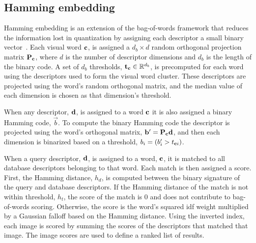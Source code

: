     \subsection{Hamming embedding}
        Hamming embedding is an extension of the bag-of-words framework that reduces the information lost in
        quantization by assigning each descriptor a small binary vector~\cite{jegou_hamming_2008,
        jegou_burstiness_2009, jegou_improving_2010}. Each visual word $\mathbf{c}$, is assigned a $d_b \times d$ random
        orthogonal projection matrix $\mathbf{P}_{\mathbf{c}}$, where $d$ is the number of descriptor dimensions and $d_b$ is
        the length of the binary code. A set of $d_b$ thresholds, $\mathbf{t}_{\mathbf{c}} \in \mathbb{R}^{d_b}$, is precomputed for
        each word using the descriptors used to form the visual word cluster. These descriptors are projected using
        the word's random orthogonal matrix, and the median value of each dimension is chosen as that dimension's
        threshold.

        When any descriptor, $\mathbf{d}$, is assigned to a word $\mathbf{c}$ it is also assigned a binary Hamming code,
        $\vec{b}$. To compute the binary Hamming code the descriptor is projected using the word's orthogonal
        matrix, $\mathbf{b}' = \mathbf{P}_{\mathbf{c}} \mathbf{d}$, and then each dimension is binarized based on a threshold, %
        $b_i = (b'_i > t_{\mathbf{c}{}i})$.

        When a query descriptor, $\mathbf{d}$, is assigned to a word, $\mathbf{c}$, it is matched to all database descriptors
        belonging to that word. Each match is then assigned a score. First, the Hamming distance, $h_d$, is
        computed between the binary signature of the query and database descriptors. If the Hamming distance of the
        match is not within threshold, $h_t$, the score of the match is $0$ and does not contribute to bag-of-words
        scoring. Otherwise, the score is the word's squared idf weight multiplied by a Gaussian falloff based on
        the Hamming distance. Using the inverted index, each image is scored by summing the scores of the
        descriptors that matched that image. The image scores are used to define a ranked list of results.

